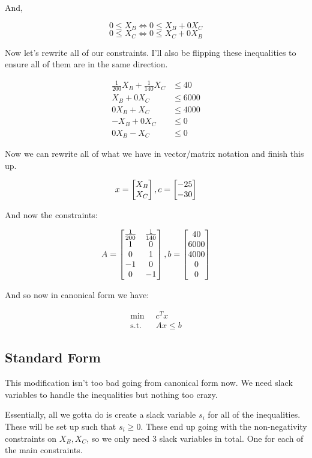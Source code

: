 And, 

\[0 \leq X_B \iff 0 \leq X_B + 0X_C\]
\[0 \leq X_C \iff 0 \leq X_C + 0X_B\]

Now let's rewrite all of our constraints. I'll also be flipping these inequalities to ensure all of them are in the same direction.

\begin{align*}
	\frac{1}{200} X_B + \frac{1}{140}X_C &\leq 40 \\
	X_B + 0X_C &\leq 6000 \\
	0X_B + X_C &\leq 4000 \\
	-X_B + 0X_C &\leq 0 \\
	0X_B - X_C &\leq 0
\end{align*}

Now we can rewrite all of what we have in vector/matrix notation and finish this up.

\[
	x = \m{b}{X_B \\ X_C}, c = \m{b}{-25 \\ -30}
\]

And now the constraints:

\[
	A = \m{b}{\frac{1}{200} & \frac{1}{140} \\ 1 & 0 \\ 0 & 1 \\ -1 & 0 \\ 0 & -1}, b = \m{b}{40 \\ 6000 \\ 4000 \\ 0 \\ 0}
\]

And so now in canonical form we have:


\begin{align*}
	\min \;\; & c^T x \\
	\text{s.t.} \;\; & Ax \leq b
\end{align*}

\subsection*{Standard Form}

This modification isn't too bad going from canonical form now. We need slack variables to handle the inequalities but nothing too crazy. 

Essentially, all we gotta do is create a slack variable $s_i$ for all of the inequalities. These will be set up such that $s_i \geq 0$. These end up going with the non-negativity constraints on $X_B, X_C$, so we only need 3 slack variables in total. One for each of the main constraints.  

